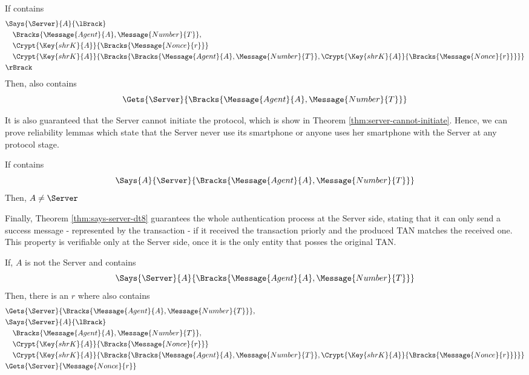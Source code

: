 \begin{theorem}
  \label{thm:says-server-dt2}
  If  contains
  \begin{align*}
    & \Says{\Server}{A}{\lBrack} \\
      & \quad \Bracks{\Message{Agent}{A}, \Message{Number}{T}}, \\
      & \quad \Crypt{\Key{shrK}{A}}{\Bracks{\Message{Nonce}{r}}} \\
      & \quad \Crypt{\Key{shrK}{A}}{\Bracks{\Bracks{\Message{Agent}{A}, \Message{Number}{T}},\Crypt{\Key{shrK}{A}}{\Bracks{\Message{Nonce}{r}}}}} \\
    & \rBrack
  \end{align*}
  Then,  also contains \\
  \[ \Gets{\Server}{\Bracks{\Message{Agent}{A}, \Message{Number}{T}}} \]
\end{theorem}

It is also guaranteed that the Server cannot initiate the protocol, which is show in Theorem \ref{thm:server-cannot-initiate}. Hence, we can prove reliability lemmas which state that the Server never use its smartphone or anyone uses her smartphone with the Server at any protocol stage.

\begin{theorem}
  \label{thm:server-cannot-initiate}
  If  contains \\ 
  \[ \Says{A}{\Server}{\Bracks{\Message{Agent}{A}, \Message{Number}{T}}}\]
  Then, $A \neq \Server$
\end{theorem}

Finally, Theorem \ref{thm:says-server-dt8} guarantees the whole authentication process at the Server side, stating that it can only send a success message - represented by the transaction - if it received the transaction priorly and the produced TAN matches the received one. This property is verifiable only at the Server side, once it is the only entity that posses the original TAN.

\begin{theorem}
  \label{thm:says-server-dt8}
  If, $A$ is not the Server and  contains
  \[ \Says{\Server}{A}{\Bracks{\Message{Agent}{A}, \Message{Number}{T}}}\]
  Then, there is an $r$ where  also contains
  \begin{align*}
    & \Gets{\Server}{\Bracks{\Message{Agent}{A}, \Message{Number}{T}}}, \\
    & \Says{\Server}{A}{\lBrack} \\
      & \quad \Bracks{\Message{Agent}{A}, \Message{Number}{T}}, \\
      & \quad \Crypt{\Key{shrK}{A}}{\Bracks{\Message{Nonce}{r}}} \\
      & \quad \Crypt{\Key{shrK}{A}}{\Bracks{\Bracks{\Message{Agent}{A}, \Message{Number}{T}},\Crypt{\Key{shrK}{A}}{\Bracks{\Message{Nonce}{r}}}}} \\
    & \Gets{\Server}{\Message{Nonce}{r}}
  \end{align*}
\end{theorem}



